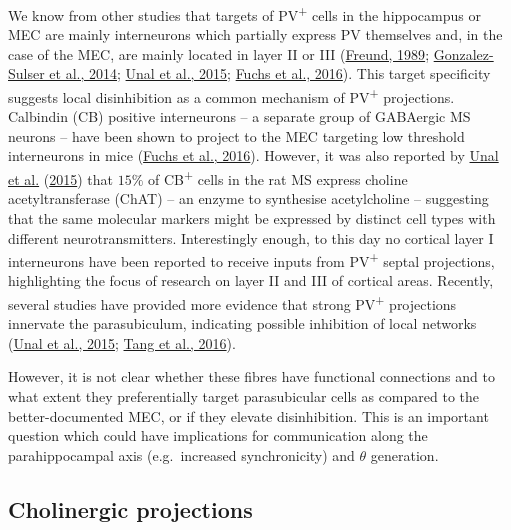 \documentclass[
  12pt,
  a4paper,
  openany]{book}
\begin{document}
We know from other studies that targets of PV\textsuperscript{+} cells in the hippocampus or MEC are mainly interneurons which partially express PV themselves and, in the case of the MEC, are mainly located in layer II or III (\protect\hyperlink{ref-freund_gabaergic_1989}{Freund, 1989}; \protect\hyperlink{ref-gonzalez-sulser_gabaergic_2014}{Gonzalez-Sulser et al., 2014}; \protect\hyperlink{ref-unal_synaptic_2015}{Unal et al., 2015}; \protect\hyperlink{ref-fuchs_local_2016}{Fuchs et al., 2016}). This target specificity suggests local disinhibition as a common mechanism of PV\textsuperscript{+} projections. Calbindin (CB) positive interneurons -- a separate group of GABAergic MS neurons -- have been shown to project to the MEC targeting low threshold interneurons in mice (\protect\hyperlink{ref-fuchs_local_2016}{Fuchs et al., 2016}). However, it was also reported by \protect\hyperlink{ref-unal_synaptic_2015}{Unal et al.} (\protect\hyperlink{ref-unal_synaptic_2015}{2015}) that \(15\%\) of CB\textsuperscript{+} cells in the rat MS express choline acetyltransferase (ChAT) -- an enzyme to synthesise acetylcholine -- suggesting that the same molecular markers might be expressed by distinct cell types with different neurotransmitters. Interestingly enough, to this day no cortical layer I interneurons have been reported to receive inputs from PV\textsuperscript{+} septal projections, highlighting the focus of research on layer II and III of cortical areas. Recently, several studies have provided more evidence that strong PV\textsuperscript{+} projections innervate the parasubiculum, indicating possible inhibition of local networks (\protect\hyperlink{ref-unal_synaptic_2015}{Unal et al., 2015}; \protect\hyperlink{ref-tang_functional_2016}{Tang et al., 2016}).

However, it is not clear whether these fibres have functional connections and to what extent they preferentially target parasubicular cells as compared to the better-documented MEC, or if they elevate disinhibition. This is an important question which could have implications for communication along the parahippocampal axis (e.g.~increased synchronicity) and \(\theta\) generation.

\hypertarget{cholinergic-projections}{%
\subsection{Cholinergic projections}\label{cholinergic-projections}}
\end{document}
